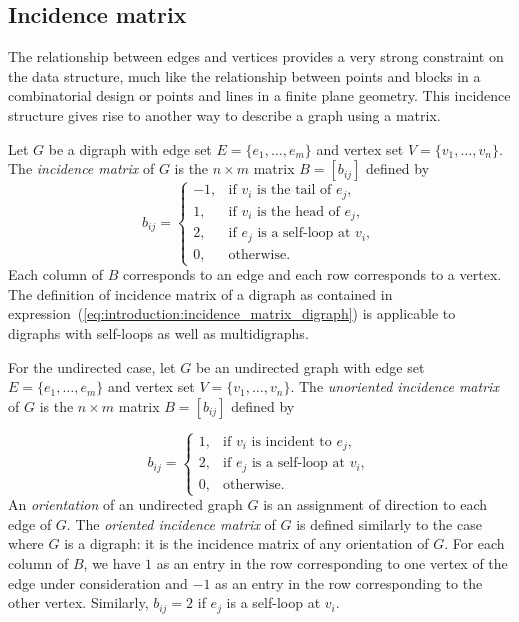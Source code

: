 
\subsection{Incidence matrix}

The relationship between edges and vertices provides a very strong
constraint on the data structure, much like the relationship between
points and blocks in a combinatorial design or points and lines in a
finite plane geometry. This incidence structure gives rise to another
way to describe a graph using a matrix.

Let $G$ be a digraph with edge set $E = \{ e_1, \dots, e_m \}$ and
vertex set $V = \{ v_1, \dots, v_n \}$. The \emph{incidence matrix} of
$G$ is the $n \times m$ matrix $B = [b_{ij}]$ defined by
%
\begin{equation}
\label{eq:introduction:incidence_matrix_digraph}
b_{ij}
=
\begin{cases}
-1, & \text{if $v_i$ is the tail of $e_j$}, \\
1,  & \text{if $v_i$ is the head of $e_j$}, \\
2,  & \text{if $e_j$ is a self-loop at $v_i$}, \\
0,  & \text{otherwise}.
\end{cases}
\end{equation}
%
Each column of $B$ corresponds to an edge and each row corresponds to
a vertex. The definition of incidence matrix of a digraph as contained
in expression~(\ref{eq:introduction:incidence_matrix_digraph}) is
applicable to digraphs with self-loops as well as multidigraphs.

For the undirected case, let $G$ be an undirected graph with edge set
$E = \{ e_1, \dots, e_m \}$ and vertex set
$V = \{ v_1, \dots, v_n \}$. The \emph{unoriented incidence matrix} of
$G$ is the $n \times m$ matrix $B = [b_{ij}]$ defined by

\[
b_{ij}
=
\begin{cases}
1, & \text{if $v_i$ is incident to $e_j$}, \\
2, & \text{if $e_j$ is a self-loop at $v_i$}, \\
0, & \text{otherwise}.
\end{cases}
\]
An \emph{orientation} of an undirected graph $G$ is an assignment of
direction to each edge of $G$. The \emph{oriented incidence matrix} of
$G$ is defined similarly to the case where $G$ is a digraph: it is the
incidence matrix of any orientation of $G$. For each column of $B$, we
have $1$ as an entry in the row corresponding to one vertex of the
edge under consideration and $-1$ as an entry in the row corresponding
to the other vertex. Similarly, $b_{ij} = 2$ if $e_j$ is a self-loop
at $v_i$.

